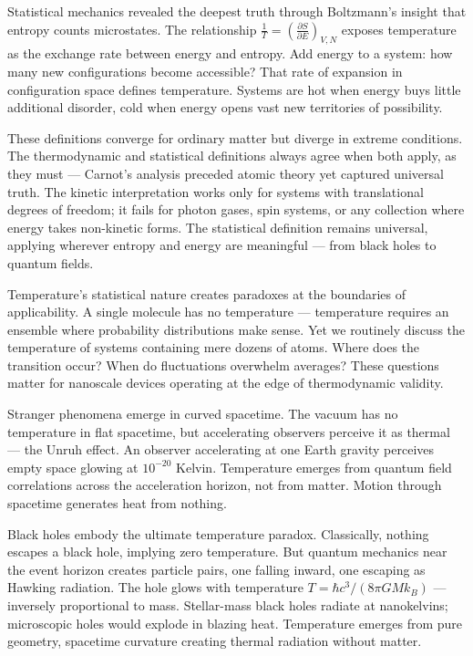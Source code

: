 Statistical mechanics revealed the deepest truth through Boltzmann's insight that entropy counts microstates. The relationship $ \frac{1}{T} = \left( \frac{\partial S}{\partial E} \right)_{V,N} $ exposes temperature as the exchange rate between energy and entropy. Add energy to a system: how many new configurations become accessible? That rate of expansion in configuration space defines temperature. Systems are hot when energy buys little additional disorder, cold when energy opens vast new territories of possibility.

These definitions converge for ordinary matter but diverge in extreme conditions. The thermodynamic and statistical definitions always agree when both apply, as they must — Carnot's analysis preceded atomic theory yet captured universal truth. The kinetic interpretation works only for systems with translational degrees of freedom; it fails for photon gases, spin systems, or any collection where energy takes non-kinetic forms. The statistical definition remains universal, applying wherever entropy and energy are meaningful — from black holes to quantum fields.

Temperature's statistical nature creates paradoxes at the boundaries of applicability. A single molecule has no temperature — temperature requires an ensemble where probability distributions make sense. Yet we routinely discuss the temperature of systems containing mere dozens of atoms. Where does the transition occur? When do fluctuations overwhelm averages? These questions matter for nanoscale devices operating at the edge of thermodynamic validity.

Stranger phenomena emerge in curved spacetime. The vacuum has no temperature in flat spacetime, but accelerating observers perceive it as thermal — the Unruh effect. An observer accelerating at one Earth gravity perceives empty space glowing at $10^{-20}$ Kelvin. Temperature emerges from quantum field correlations across the acceleration horizon, not from matter. Motion through spacetime generates heat from nothing.

Black holes embody the ultimate temperature paradox. Classically, nothing escapes a black hole, implying zero temperature. But quantum mechanics near the event horizon creates particle pairs, one falling inward, one escaping as Hawking radiation. The hole glows with temperature $T = \hbar c^3 / (8\pi G M k_B)$ — inversely proportional to mass. Stellar-mass black holes radiate at nanokelvins; microscopic holes would explode in blazing heat. Temperature emerges from pure geometry, spacetime curvature creating thermal radiation without matter.

